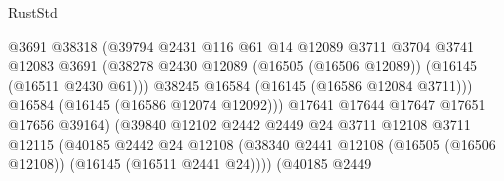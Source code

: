 \begin{lexlean}{RustStd}
\begin{coremodule}
                                            @3691
                                            @38318
                                            (@39794
                                              @2431
                                              @116
                                              @61
                                              @14
                                              @12089
                                              @3711
                                              @3704
                                              @3741
                                              @12083
                                              @3691
                                              (@38278
                                                @2430
                                                @12089
                                                (@16505 (@16506 @12089))
                                                (@16145 (@16511 @2430 @61)))
                                              @38245
                                              @16584
                                              (@16145 (@16586 @12084 @3711)))
                                            @16584
                                            (@16145 (@16586 @12074 @12092)))
                                          @17641
                                          @17644
                                          @17647
                                          @17651
                                          @17656
                                          @39164)
                                        (@39840
                                          @12102
                                          @2442
                                          @2449
                                          @24
                                          @3711
                                          @12108
                                          @3711
                                          @12115
                                          (@40185
                                            @2442
                                            @24
                                            @12108
                                            (@38340
                                              @2441
                                              @12108
                                              (@16505 (@16506 @12108))
                                              (@16145 (@16511 @2441 @24))))
                                          (@40185
                                            @2449

\end{coremodule}
\end{lexlean}
